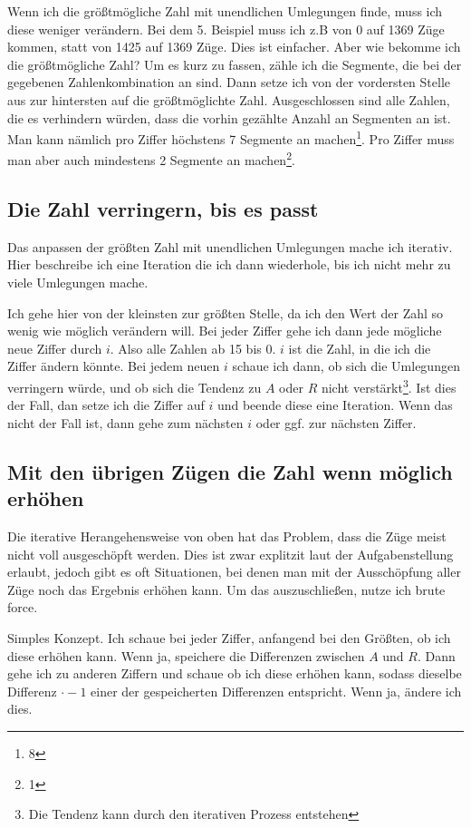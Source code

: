 \documentclass[a4paper,10pt,ngerman]{scrartcl}
\begin{document}
Wenn ich die größtmögliche Zahl mit unendlichen Umlegungen finde, muss ich diese weniger verändern. Bei dem 5. Beispiel muss ich z.B von 0 auf 1369 Züge kommen, statt von 1425 auf 1369 Züge. Dies ist einfacher. Aber wie bekomme ich die größtmögliche Zahl? Um es kurz zu fassen, zähle ich die Segmente, die bei der gegebenen Zahlenkombination an sind. Dann setze ich von der vordersten Stelle aus zur hintersten auf die größtmöglichte Zahl. Ausgeschlossen sind alle Zahlen, die es verhindern würden, dass die vorhin gezählte Anzahl an Segmenten an ist. Man kann nämlich pro Ziffer höchstens 7 Segmente an machen\footnote{8}. Pro Ziffer muss man aber auch mindestens 2 Segmente an machen\footnote{1}.

\subsection{Die Zahl verringern, bis es passt}

Das anpassen der größten Zahl mit unendlichen Umlegungen mache ich iterativ. Hier beschreibe ich eine Iteration die ich dann wiederhole, bis ich nicht mehr zu viele Umlegungen mache.

Ich gehe hier von der kleinsten zur größten Stelle, da ich den Wert der Zahl so wenig wie möglich verändern will. Bei jeder Ziffer gehe ich dann jede mögliche neue Ziffer durch $i$. Also alle Zahlen ab 15 bis 0. $i$ ist die Zahl, in die ich die Ziffer ändern könnte. Bei jedem neuen $i$ schaue ich dann, ob sich die Umlegungen verringern würde, und ob sich die Tendenz zu $A$ oder $R$ nicht verstärkt\footnote{Die Tendenz kann durch den iterativen Prozess entstehen}. Ist dies der Fall, dan setze ich die Ziffer auf $i$ und beende diese eine Iteration. Wenn das nicht der Fall ist, dann gehe zum nächsten $i$ oder ggf. zur nächsten Ziffer.

\subsection{Mit den übrigen Zügen die Zahl wenn möglich erhöhen}

Die iterative Herangehensweise von oben hat das Problem, dass die Züge meist nicht voll ausgeschöpft werden. Dies ist zwar explitzit laut der Aufgabenstellung erlaubt, jedoch gibt es oft Situationen, bei denen man mit der Ausschöpfung aller Züge noch das Ergebnis erhöhen kann. Um das auszuschließen, nutze ich brute force.

Simples Konzept. Ich schaue bei jeder Ziffer, anfangend bei den Größten, ob ich diese erhöhen kann. Wenn ja, speichere die Differenzen zwischen $A$ und $R$.
Dann gehe ich zu anderen Ziffern und schaue ob ich diese erhöhen kann, sodass dieselbe Differenz $\cdot -1$ einer der gespeicherten Differenzen entspricht. Wenn ja, ändere ich dies.
 
\end{document}
